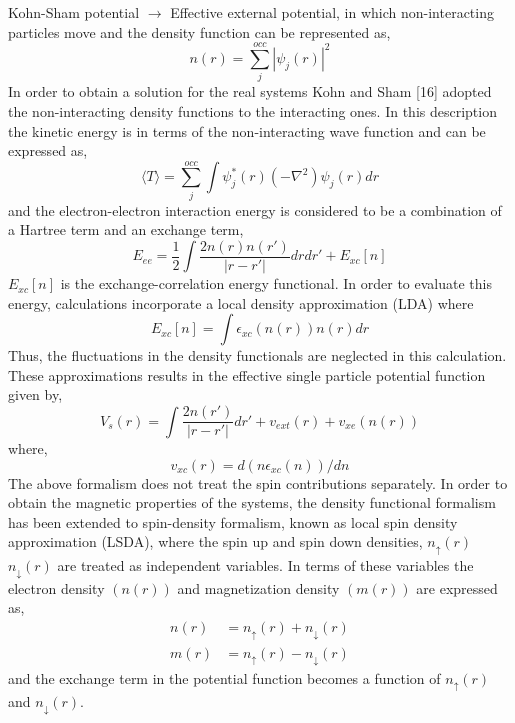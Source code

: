 Kohn-Sham potential $\to$ Effective external potential, in which non-interacting particles move and the density function can be represented as,
\begin{equation*}
n(r)=\sum\limits^{occ}_{j}|\psi_{j}(r)|^{2}\tag{2.13}
\end{equation*}
In order to obtain a solution for the real systems Kohn and Sham [16] adopted the non-interacting density functions to the interacting ones. In this description the kinetic energy is in terms of the non-interacting wave function and can be expressed as,
\begin{equation*}
\langle T\rangle =\sum\limits^{occ}_{j}\int\psi^{*}_{j}(r)(-\nabla^{2})\psi_{j}(r)dr\tag{2.14}
\end{equation*}
and the electron-electron interaction energy is considered to be a combination of a Hartree term and an exchange term,
\begin{equation*}
E_{ee}=\dfrac{1}{2}\int \dfrac{2n(r)n(r')}{|r-r'|}drdr'+E_{xc}[n]\tag{2.15}
\end{equation*}
$E_{xc}[n]$ is the exchange-correlation energy functional. In order to evaluate this energy, calculations incorporate a local density approximation (LDA) where
\begin{equation*}
E_{xc}[n]=\int \epsilon_{xc}(n(r))n(r)dr\tag{2.16}
\end{equation*}
Thus, the fluctuations in the density functionals are neglected in this calculation. These approximations results in the effective single particle potential function given by,
\begin{equation*}
V_{s}(r)=\int \dfrac{2n(r')}{|r-r'|}dr'+v_{ext}(r)+v_{xe}(n(r))\tag{2.17}
\end{equation*}
where,
\begin{equation*}
v_{xc}(r)=d(n\epsilon_{xc}(n))/dn\tag{2.18}
\end{equation*}
The above formalism does not treat the spin contributions separately. In order to obtain the magnetic properties of the systems, the density functional formalism has been extended to spin-density formalism, known as local spin density approximation (LSDA), where the spin up and spin down densities, $n_{\uparrow}(r)$ $n_{\downarrow}(r)$ are treated as independent variables. In terms of these variables the electron density $(n(r))$ and magnetization density $(m(r))$ are expressed as,
\begin{align*}
n(r) &= n_{\uparrow} (r)+n_{\downarrow}(r)\tag{2.19}\\
m(r) &= n_{\uparrow} (r)-n_{\downarrow}(r)\tag{2.20}
\end{align*}
and the exchange term in the potential function becomes a function of $n_{\uparrow}(r)$ and $n_{\downarrow}(r)$. 

